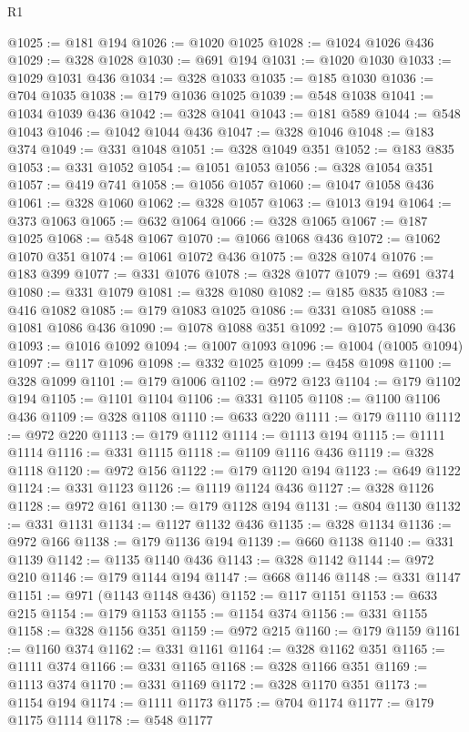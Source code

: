 \begin{lexlean}{R1}
\begin{coremodule}
@1025 := @181 @194
@1026 := @1020 @1025
@1028 := @1024 @1026 @436
@1029 := @328 @1028
@1030 := @691 @194
@1031 := @1020 @1030
@1033 := @1029 @1031 @436
@1034 := @328 @1033
@1035 := @185 @1030
@1036 := @704 @1035
@1038 := @179 @1036 @1025
@1039 := @548 @1038
@1041 := @1034 @1039 @436
@1042 := @328 @1041
@1043 := @181 @589
@1044 := @548 @1043
@1046 := @1042 @1044 @436
@1047 := @328 @1046
@1048 := @183 @374
@1049 := @331 @1048
@1051 := @328 @1049 @351
@1052 := @183 @835
@1053 := @331 @1052
@1054 := @1051 @1053
@1056 := @328 @1054 @351
@1057 := @419 @741
@1058 := @1056 @1057
@1060 := @1047 @1058 @436
@1061 := @328 @1060
@1062 := @328 @1057
@1063 := @1013 @194
@1064 := @373 @1063
@1065 := @632 @1064
@1066 := @328 @1065
@1067 := @187 @1025
@1068 := @548 @1067
@1070 := @1066 @1068 @436
@1072 := @1062 @1070 @351
@1074 := @1061 @1072 @436
@1075 := @328 @1074
@1076 := @183 @399
@1077 := @331 @1076
@1078 := @328 @1077
@1079 := @691 @374
@1080 := @331 @1079
@1081 := @328 @1080
@1082 := @185 @835
@1083 := @416 @1082
@1085 := @179 @1083 @1025
@1086 := @331 @1085
@1088 := @1081 @1086 @436
@1090 := @1078 @1088 @351
@1092 := @1075 @1090 @436
@1093 := @1016 @1092
@1094 := @1007 @1093
@1096 := @1004 (@1005 @1094)
@1097 := @117 @1096
@1098 := @332 @1025
@1099 := @458 @1098
@1100 := @328 @1099
@1101 := @179 @1006
@1102 := @972 @123
@1104 := @179 @1102 @194
@1105 := @1101 @1104
@1106 := @331 @1105
@1108 := @1100 @1106 @436
@1109 := @328 @1108
@1110 := @633 @220
@1111 := @179 @1110
@1112 := @972 @220
@1113 := @179 @1112
@1114 := @1113 @194
@1115 := @1111 @1114
@1116 := @331 @1115
@1118 := @1109 @1116 @436
@1119 := @328 @1118
@1120 := @972 @156
@1122 := @179 @1120 @194
@1123 := @649 @1122
@1124 := @331 @1123
@1126 := @1119 @1124 @436
@1127 := @328 @1126
@1128 := @972 @161
@1130 := @179 @1128 @194
@1131 := @804 @1130
@1132 := @331 @1131
@1134 := @1127 @1132 @436
@1135 := @328 @1134
@1136 := @972 @166
@1138 := @179 @1136 @194
@1139 := @660 @1138
@1140 := @331 @1139
@1142 := @1135 @1140 @436
@1143 := @328 @1142
@1144 := @972 @210
@1146 := @179 @1144 @194
@1147 := @668 @1146
@1148 := @331 @1147
@1151 := @971 (@1143 @1148 @436)
@1152 := @117 @1151
@1153 := @633 @215
@1154 := @179 @1153
@1155 := @1154 @374
@1156 := @331 @1155
@1158 := @328 @1156 @351
@1159 := @972 @215
@1160 := @179 @1159
@1161 := @1160 @374
@1162 := @331 @1161
@1164 := @328 @1162 @351
@1165 := @1111 @374
@1166 := @331 @1165
@1168 := @328 @1166 @351
@1169 := @1113 @374
@1170 := @331 @1169
@1172 := @328 @1170 @351
@1173 := @1154 @194
@1174 := @1111 @1173
@1175 := @704 @1174
@1177 := @179 @1175 @1114
@1178 := @548 @1177

\end{coremodule}
\end{lexlean}
